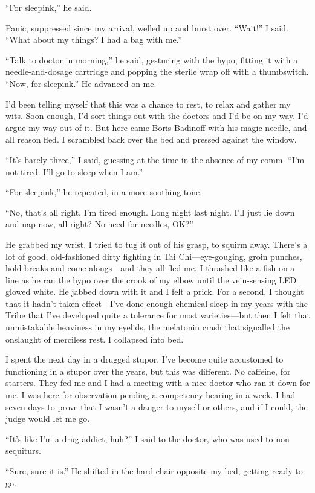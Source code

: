 “For sleepink,” he said.

Panic, suppressed since my arrival, welled up and burst over.
“Wait!” I said. “What about my things? I had a bag with me.”

“Talk to doctor in morning,” he said, gesturing with the hypo,
fitting it with a needle-and-dosage cartridge and popping the
sterile wrap off with a thumbswitch. “Now, for sleepink.” He
advanced on me.

I’d been telling myself that this was a chance to rest, to relax
and gather my wits. Soon enough, I’d sort things out with the
doctors and I’d be on my way. I’d argue my way out of it. But here
came Boris Badinoff with his magic needle, and all reason fled. I
scrambled back over the bed and pressed against the window.

“It’s barely three,” I said, guessing at the time in the absence of
my comm. “I’m not tired. I’ll go to sleep when I am.”

“For sleepink,” he repeated, in a more soothing tone.

“No, that’s all right. I’m tired enough. Long night last night.
I’ll just lie down and nap now, all right? No need for needles,
OK?”

He grabbed my wrist. I tried to tug it out of his grasp, to squirm
away. There’s a lot of good, old-fashioned dirty fighting in Tai
Chi—eye-gouging, groin punches, hold-breaks and come-alongs—and
they all fled me. I thrashed like a fish on a line as he ran the
hypo over the crook of my elbow until the vein-sensing LED glowed
white. He jabbed down with it and I felt a prick. For a second, I
thought that it hadn’t taken effect—I’ve done enough chemical sleep
in my years with the Tribe that I’ve developed quite a tolerance
for most varieties—but then I felt that unmistakable heaviness in
my eyelids, the melatonin crash that signalled the onslaught of
merciless rest. I collapsed into bed.

I spent the next day in a drugged stupor. I’ve become quite
accustomed to functioning in a stupor over the years, but this was
different. No caffeine, for starters. They fed me and I had a
meeting with a nice doctor who ran it down for me. I was here for
observation pending a competency hearing in a week. I had seven
days to prove that I wasn’t a danger to myself or others, and if I
could, the judge would let me go.

“It’s like I’m a drug addict, huh?” I said to the doctor, who was
used to non sequiturs.

“Sure, sure it is.” He shifted in the hard chair opposite my bed,
getting ready to go.

